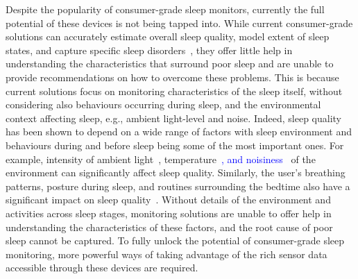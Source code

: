 Despite the popularity of consumer-grade sleep monitors, currently the full potential of these devices is not being tapped into. While current consumer-grade solutions can accurately estimate overall sleep quality, model extent of sleep states, and capture specific sleep disorders~\cite{kay2012lullaby,zhang2013real,sleepmonitor}, they offer little help in understanding the characteristics that surround poor sleep and are unable to provide recommendations on how to overcome these problems. This is because current solutions focus on monitoring characteristics of the sleep itself, without considering also behaviours occurring during sleep, and the environmental context affecting sleep, e.g., ambient light-level and noise. Indeed, sleep quality has been shown to depend on a wide range of factors with sleep environment and behaviours during and before sleep being some of the most important ones. For example, intensity of ambient light~\cite{hood04determinants}, temperature\textcolor{blue}{~\cite{}, and noisiness~\cite{}} of the environment can significantly affect sleep quality. Similarly, the user's breathing patterns, posture during sleep, and routines surrounding the bedtime also have a significant impact on sleep quality\textcolor{blue}{~\cite{}}. Without details of the environment and activities across sleep stages,  monitoring solutions are unable to offer help in understanding the characteristics of these factors, and the root cause of poor sleep cannot be captured. To fully unlock the potential of consumer-grade sleep monitoring, more powerful ways of taking advantage of the rich sensor data accessible through these devices are required.








